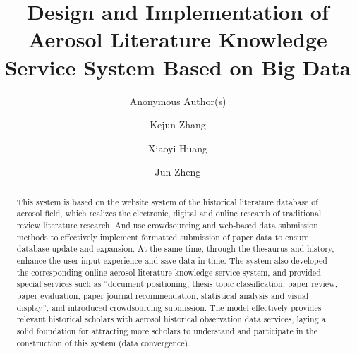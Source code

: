 \documentclass[sigchi, review]{acmart}
\begin{document}
	\title{Design and Implementation of Aerosol Literature Knowledge Service System Based on Big Data}
	\subtitle{Anonymous Author(s)}
	
	\author{Kejun Zhang}
	
	\author{Xiaoyi Huang}
	
	\author{Jun Zheng}
	
	
	
	\renewcommand{\shortauthors}{B. Trovato et al.}
	
	
	\begin{abstract}
		This system is based on the website system of the historical literature database of aerosol field, which realizes the electronic, digital and online research of traditional review literature research. And use crowdsourcing and web-based data submission methods to effectively implement formatted submission of paper data to ensure database update and expansion. At the same time, through the thesaurus and history, enhance the user input experience and save data in time. The system also developed the corresponding online aerosol literature knowledge service system, and provided special services such as “document positioning, thesis topic classification, paper review, paper evaluation, paper journal recommendation, statistical analysis and visual display”, and introduced crowdsourcing submission. The model effectively provides relevant historical scholars with aerosol historical observation data services, laying a solid foundation for attracting more scholars to understand and participate in the construction of this system (data convergence).
	\end{abstract}
	
\end{document}
